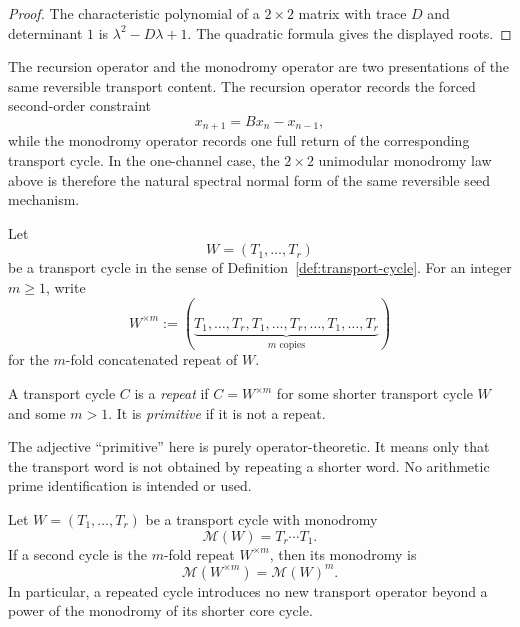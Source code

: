 \begin{proof}
The characteristic polynomial of a $2\times 2$ matrix with trace $D$ and
determinant $1$ is $\lambda^2-D\lambda+1$. The quadratic formula gives the
displayed roots.
\end{proof}

\begin{remark}
\label{rem:recursion-and-monodromy}
The recursion operator and the monodromy operator are two presentations of the
same reversible transport content. The recursion operator records the forced
second-order constraint
\[
x_{n+1}=Bx_n-x_{n-1},
\]
while the monodromy operator records one full return of the corresponding
transport cycle. In the one-channel case, the $2\times 2$ unimodular
monodromy law above is therefore the natural spectral normal form of the same
reversible seed mechanism.
\end{remark}

\begin{definition}
\label{def:primitive-transport-cycle}
Let
\[
W=(T_1,\dots,T_r)
\]
be a transport cycle in the sense of Definition~\ref{def:transport-cycle}. For
an integer \(m\ge 1\), write
\[
W^{\times m}
:=
(\underbrace{T_1,\dots,T_r,T_1,\dots,T_r,\dots,T_1,\dots,T_r}_{m\text{ copies}})
\]
for the \(m\)-fold concatenated repeat of \(W\).

A transport cycle \(C\) is a \emph{repeat} if \(C=W^{\times m}\) for some
shorter transport cycle \(W\) and some \(m>1\). It is \emph{primitive} if it is
not a repeat.
\end{definition}

\begin{remark}
\label{rem:primitive-not-arithmetic}
The adjective ``primitive'' here is purely operator-theoretic. It means only
that the transport word is not obtained by repeating a shorter word. No
arithmetic prime identification is intended or used.
\end{remark}

\begin{proposition}
\label{prop:repeat-cycle-monodromy-factorization}
Let \(W=(T_1,\dots,T_r)\) be a transport cycle with monodromy
\[
\mathcal M(W)=T_r\cdots T_1.
\]
If a second cycle is the \(m\)-fold repeat \(W^{\times m}\), then its monodromy
is
\[
\mathcal M(W^{\times m})=\mathcal M(W)^m.
\]
In particular, a repeated cycle introduces no new transport operator beyond a
power of the monodromy of its shorter core cycle.
\end{proposition}

